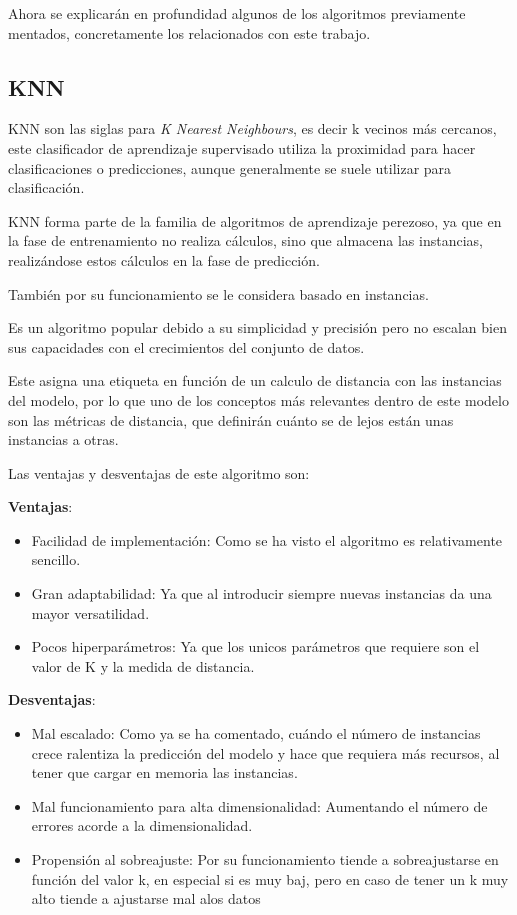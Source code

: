 Ahora se explicarán en profundidad algunos de los algoritmos previamente mentados, concretamente los relacionados con este trabajo. 

\subsection{KNN}
KNN\cite{ibmQuKNN} son las siglas para \textit{K Nearest Neighbours}, es decir k vecinos más cercanos, este clasificador de aprendizaje supervisado utiliza la proximidad para hacer clasificaciones o predicciones, aunque generalmente se suele utilizar para clasificación. 

KNN forma parte de la familia de algoritmos de aprendizaje perezoso, ya que en la fase de entrenamiento no realiza cálculos, sino que almacena las instancias, realizándose estos cálculos en la fase de predicción.

También por su funcionamiento se le considera basado en instancias.

Es un algoritmo popular debido a su simplicidad y precisión pero no escalan bien sus capacidades con el crecimientos del conjunto de datos.

Este asigna una etiqueta en función de un calculo de distancia con las instancias del modelo, por lo que uno de los conceptos más relevantes dentro de este modelo son las métricas de distancia, que definirán cuánto se de lejos están unas instancias a otras.

Las ventajas y desventajas de este algoritmo son:

\textbf{Ventajas}:

\begin{itemize}
	\item{Facilidad de implementación}: Como se ha visto el algoritmo es relativamente sencillo.
	
	\item{Gran adaptabilidad}: Ya que al introducir siempre nuevas instancias da una mayor versatilidad.
	
	\item{Pocos hiperparámetros}: Ya que los unicos parámetros que requiere son el valor de K y la medida de distancia.
\end{itemize}

\textbf{Desventajas}:

\begin{itemize}
	\item{Mal escalado}: Como ya se ha comentado, cuándo el número de instancias crece ralentiza la predicción del modelo y hace que requiera más recursos, al tener que cargar en memoria las instancias.
	
	\item{Mal funcionamiento para alta dimensionalidad}: Aumentando el número de errores acorde a la dimensionalidad.
	
	\item{Propensión al sobreajuste}: Por su funcionamiento tiende a sobreajustarse en función del valor k, en especial si es muy baj, pero en caso de tener un k muy alto tiende a ajustarse mal alos datos 
	
\end{itemize}

